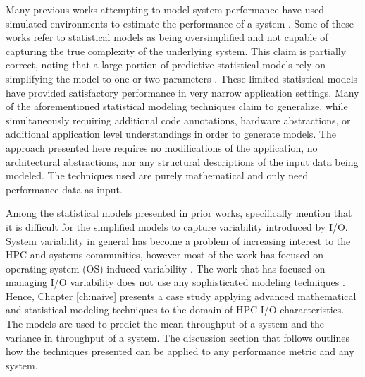 Many previous works attempting to model system performance have used
simulated environments to estimate the performance of a system
\cite{grobelny2007fase,wang2009simulation,wang2013towards}. Some
of these works refer to statistical models as being oversimplified and
not capable of capturing the true complexity of the underlying
system. This claim is partially correct, noting that a large portion
of predictive statistical models rely on simplifying the model to one
or two parameters
\cite{snavely2002framework,bailey2005performance,barker2009using,ye2010analyzing}.
These limited statistical models have provided satisfactory
performance in very narrow application settings. Many of the
aforementioned statistical modeling techniques claim to generalize,
while simultaneously requiring additional code annotations, hardware
abstractions, or additional application level understandings in order
to generate models. The approach presented here requires no
modifications of the application, no architectural abstractions, nor
any structural descriptions of the input data being modeled. The
techniques used are purely mathematical and only need performance data
as input.

Among the statistical models presented in prior works,
\cite{bailey2005performance} specifically mention that it is difficult
for the simplified models to capture variability introduced by
I/O. System variability in general has become a problem of increasing
interest to the HPC and systems communities, however most of the work
has focused on operating system (OS) induced variability
\cite{beckman2008benchmarking,de2007identifying}. The work that has
focused on managing I/O variability does not use any sophisticated
modeling techniques \cite{lofstead2010managing}. Hence, Chapter
\ref{ch:naive} presents a case study applying advanced mathematical
and statistical modeling techniques to the domain of HPC I/O
characteristics. The models are used to predict the mean throughput of
a system and the variance in throughput of a system. The discussion
section that follows outlines how the techniques presented can be
applied to any performance metric and any system.
